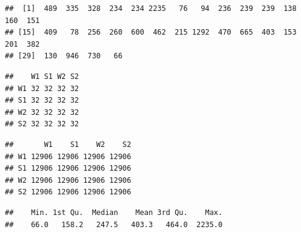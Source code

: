 \documentclass[]{article}
\newenvironment{Shaded}{\begin{snugshade}}{\end{snugshade}}
\newcommand{\KeywordTok}[1]{\textcolor[rgb]{0.13,0.29,0.53}{\textbf{#1}}}
\newcommand{\DataTypeTok}[1]{\textcolor[rgb]{0.13,0.29,0.53}{#1}}
\newcommand{\OtherTok}[1]{\textcolor[rgb]{0.56,0.35,0.01}{#1}}
\newcommand{\OperatorTok}[1]{\textcolor[rgb]{0.81,0.36,0.00}{\textbf{#1}}}
\newcommand{\NormalTok}[1]{#1}
\begin{document}
\begin{Shaded}
\end{Shaded}

\begin{verbatim}
##  [1]  489  335  328  234  234 2235   76   94  236  239  239  138  160  151
## [15]  409   78  256  260  600  462  215 1292  470  665  403  153  201  382
## [29]  130  946  730   66
\end{verbatim}

\begin{Shaded}
\end{Shaded}

\begin{verbatim}
##    W1 S1 W2 S2
## W1 32 32 32 32
## S1 32 32 32 32
## W2 32 32 32 32
## S2 32 32 32 32
\end{verbatim}

\begin{Shaded}
\end{Shaded}

\begin{verbatim}
##       W1    S1    W2    S2
## W1 12906 12906 12906 12906
## S1 12906 12906 12906 12906
## W2 12906 12906 12906 12906
## S2 12906 12906 12906 12906
\end{verbatim}

\begin{Shaded}
\end{Shaded}

\begin{verbatim}
##    Min. 1st Qu.  Median    Mean 3rd Qu.    Max. 
##    66.0   158.2   247.5   403.3   464.0  2235.0
\end{verbatim}
\end{document}

